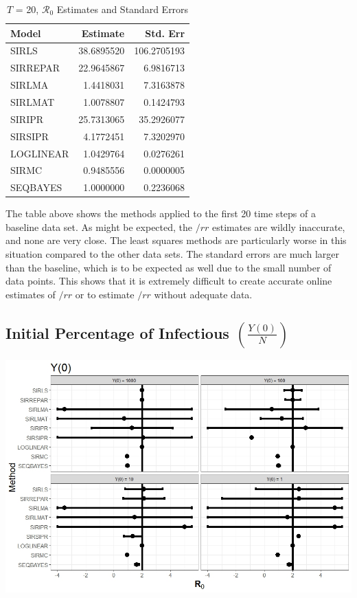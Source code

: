 \message{ !name(draft_v13.tex)}\documentclass[12pt]{article}
\newcommand{\rr}{\ensuremath{\mathcal{R}_0}}
\begin{document}
\begin{table}[H]
	
	\caption{\label{tab:} $T$ = 20, $\rr$ Estimates and Standard Errors}
	\centering
	\begin{tabular}[t]{l|r|r}
		\hline
		Model & Estimate & Std. Err\\
		\hline
		SIRLS & 38.6895520 & 106.2705193\\
		\hline
		SIRREPAR & 22.9645867 & 6.9816713\\
		\hline
		SIRLMA & 1.4418031 & 7.3163878\\
		\hline
		SIRLMAT & 1.0078807 & 0.1424793\\
		\hline
		SIRIPR & 25.7313065 & 35.2926077\\
		\hline
		SIRSIPR & 4.1772451 & 7.3202970\\
		\hline
		LOGLINEAR & 1.0429764 & 0.0276261\\
		\hline
		SIRMC & 0.9485556 & 0.0000005\\
		\hline
		SEQBAYES & 1.0000000 & 0.2236068\\
		\hline
	\end{tabular}
\end{table}

The table above shows the methods applied to the first 20 time steps of a baseline data set. As might be expected, the $/rr$ estimates are wildly inaccurate, and none are very close. The least squares methods are particularly worse in this situation compared to the other data sets. The standard errors are much larger than the baseline, which is to be expected as well due to the small number of data points. This shows that it is extremely difficult to create accurate online estimates of $/rr$ or to estimate $/rr$ without adequate data. 

\subsection{Initial Percentage of Infectious $\left (\frac{Y(0)}{N}\right)$}\label{sec:res-inf}

\includegraphics[scale=0.5]{images/start.jpeg}
\end{document}
